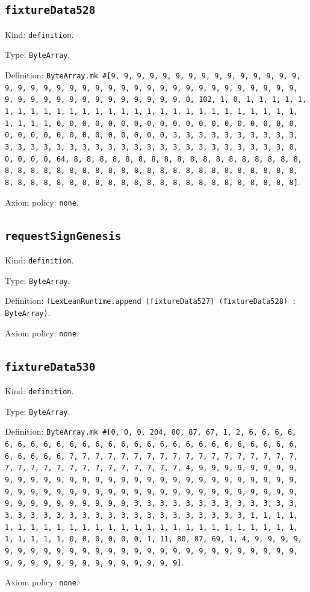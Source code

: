 \documentclass[11pt]{article}
\begin{document}
\subsection*{\texttt{fixtureData528}}
\noindent Kind: \texttt{definition}.\par
\noindent Type: \texttt{ByteArray}.\par
\noindent Definition: \texttt{ByteArray.mk \#[9, 9, 9, 9, 9, 9, 9, 9, 9, 9, 9, 9, 9, 9, 9, 9, 9, 9, 9, 9, 9, 9, 9, 9, 9, 9, 9, 9, 9, 9, 9, 9, 9, 9, 9, 9, 9, 9, 9, 9, 9, 9, 9, 9, 9, 9, 9, 9, 9, 9, 9, 9, 0, 102, 1, 0, 1, 1, 1, 1, 1, 1, 1, 1, 1, 1, 1, 1, 1, 1, 1, 1, 1, 1, 1, 1, 1, 1, 1, 1, 1, 1, 1, 1, 1, 1, 1, 1, 0, 0, 0, 0, 0, 0, 0, 0, 0, 0, 0, 0, 0, 0, 0, 0, 0, 0, 0, 0, 0, 0, 0, 0, 0, 0, 0, 0, 0, 0, 0, 0, 3, 3, 3, 3, 3, 3, 3, 3, 3, 3, 3, 3, 3, 3, 3, 3, 3, 3, 3, 3, 3, 3, 3, 3, 3, 3, 3, 3, 3, 3, 3, 3, 0, 0, 0, 0, 0, 64, 8, 8, 8, 8, 8, 8, 8, 8, 8, 8, 8, 8, 8, 8, 8, 8, 8, 8, 8, 8, 8, 8, 8, 8, 8, 8, 8, 8, 8, 8, 8, 8, 8, 8, 8, 8, 8, 8, 8, 8, 8, 8, 8, 8, 8, 8, 8, 8, 8, 8, 8, 8, 8, 8, 8, 8, 8, 8, 8, 8, 8, 8, 8, 8]}.\par
\noindent Axiom policy: \texttt{none}.\par
\subsection*{\texttt{requestSignGenesis}}
\noindent Kind: \texttt{definition}.\par
\noindent Type: \texttt{ByteArray}.\par
\noindent Definition: \texttt{(LexLeanRuntime.append (fixtureData527) (fixtureData528) : ByteArray)}.\par
\noindent Axiom policy: \texttt{none}.\par
\subsection*{\texttt{fixtureData530}}
\noindent Kind: \texttt{definition}.\par
\noindent Type: \texttt{ByteArray}.\par
\noindent Definition: \texttt{ByteArray.mk \#[0, 0, 0, 204, 80, 87, 67, 1, 2, 6, 6, 6, 6, 6, 6, 6, 6, 6, 6, 6, 6, 6, 6, 6, 6, 6, 6, 6, 6, 6, 6, 6, 6, 6, 6, 6, 6, 6, 6, 6, 6, 7, 7, 7, 7, 7, 7, 7, 7, 7, 7, 7, 7, 7, 7, 7, 7, 7, 7, 7, 7, 7, 7, 7, 7, 7, 7, 7, 7, 7, 7, 7, 7, 4, 9, 9, 9, 9, 9, 9, 9, 9, 9, 9, 9, 9, 9, 9, 9, 9, 9, 9, 9, 9, 9, 9, 9, 9, 9, 9, 9, 9, 9, 9, 9, 9, 9, 9, 9, 9, 9, 9, 9, 9, 9, 9, 9, 9, 9, 9, 9, 9, 9, 9, 9, 9, 9, 9, 9, 9, 9, 9, 9, 9, 9, 9, 9, 9, 3, 3, 3, 3, 3, 3, 3, 3, 3, 3, 3, 3, 3, 3, 3, 3, 3, 3, 3, 3, 3, 3, 3, 3, 3, 3, 3, 3, 3, 3, 3, 3, 1, 1, 1, 1, 1, 1, 1, 1, 1, 1, 1, 1, 1, 1, 1, 1, 1, 1, 1, 1, 1, 1, 1, 1, 1, 1, 1, 1, 1, 1, 1, 1, 0, 0, 0, 0, 0, 0, 1, 11, 80, 87, 69, 1, 4, 9, 9, 9, 9, 9, 9, 9, 9, 9, 9, 9, 9, 9, 9, 9, 9, 9, 9, 9, 9, 9, 9, 9, 9, 9, 9, 9, 9, 9, 9, 9, 9, 9, 9, 9, 9, 9, 9, 9, 9, 9]}.\par
\noindent Axiom policy: \texttt{none}.\par
\end{document}
